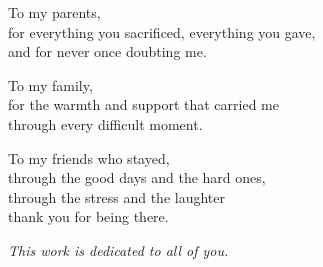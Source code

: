
\clearpage
\thispagestyle{empty}

\vspace*{4cm}

\begin{center}

  \begin{minipage}{0.75\textwidth}
    \centering
    {\normalsize

    To my parents,\\
    for everything you sacrificed, everything you gave,\\
    and for never once doubting me.

    \vspace{1.2cm}

    To my family,\\
    for the warmth and support that carried me\\
    through every difficult moment.

    \vspace{1.2cm}

    To my friends who stayed,\\
    through the good days and the hard ones,\\
    through the stress and the laughter \\
    thank you for being there.

    }
  \end{minipage}

  \vspace{3cm}

  {\small \textit{This work is dedicated to all of you.}}

\end{center}

\clearpage
